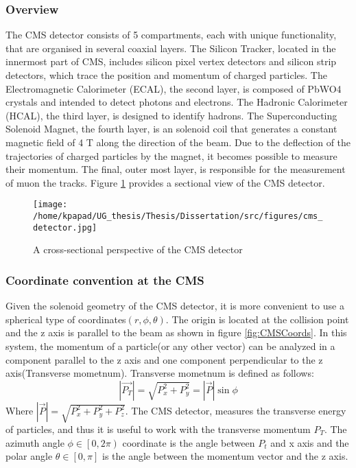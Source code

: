 \subsubsection{Overview}
\label{sec:org3cfeb42}
The CMS detector consists of 5 compartments, each with unique functionality, that are organised in several coaxial layers. The Silicon Tracker, located in the innermost part of CMS, includes silicon pixel vertex detectors and silicon strip detectors, which trace the position and momentum of charged particles. The Electromagnetic Calorimeter (ECAL), the second layer, is composed of PbWO4 crystals and intended to detect photons and electrons. The Hadronic Calorimeter (HCAL), the third layer, is designed to identify hadrons. The Superconducting Solenoid Magnet, the fourth layer, is an solenoid coil that generates a constant magnetic field of 4 T along the direction of the  beam. Due to the deflection of the trajectories of charged particles by the magnet, it becomes possible to measure their momentum. The final, outer most layer, is responsible for the measurement of muon the tracks. Figure \ref{fig:CMS_detector}\cite{CMSDetectorOverview} provides a sectional view of the CMS detector.
\begin{figure}[hb]
\centering
\texttt{[image: /home/kpapad/UG\_thesis/Thesis/Dissertation/src/figures/cms\_detector.jpg]}
\caption{A cross-sectional perspective of the CMS detector}
\label{fig:CMS_detector}
\end{figure}

\subsubsection{Coordinate convention at the CMS}
\label{sec:orge8fa37a}
Given the solenoid geometry of the CMS detector, it is more convenient to use a spherical type of coordinates\(\left(r, \phi, \theta \right)\). The origin is located at the collision point and the z axis is parallel to the beam as shown in figure \ref{fig:CMSCoords}. In this system, the momentum of a particle(or any other vector) can be analyzed in a component parallel to the z axis and one component perpendicular to the z axis(Transverse mometnum). Transverse mometnum is defined as follows:
\begin{equation}
|\vec{P_{T}}| = \sqrt{P_{x}^{2} + P_{y}^{2}} = |\vec{P}|\sin{\phi}
\end{equation}
Where \(|\vec{P}| = \sqrt{P_{x}^{2} + P_{y}^{2} + P_{z}^{2}}\). The CMS detector, measures the transverse energy\cite{MomentumCMS} of particles, and thus it is useful to work with the transverse momentum \(P_{T}\). The azimuth angle  \(\phi \in \left[0, 2\pi\right)\) coordinate is the angle between \(P_{t}\) and x axis and the polar angle  \(\theta \in \left[0, \pi   \right]\) is the angle between the momentum vector and the z axis.

